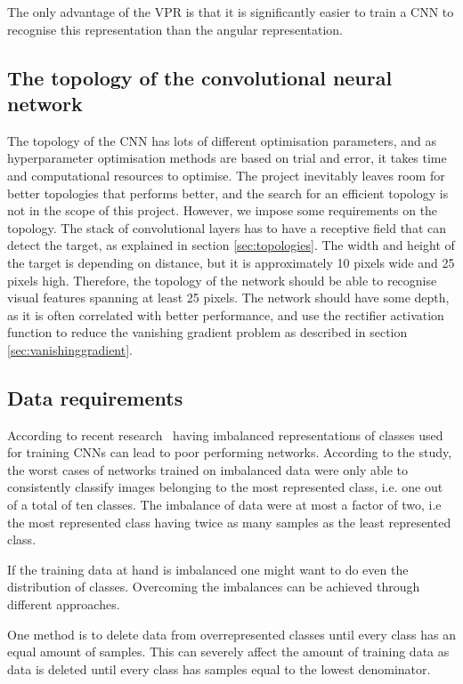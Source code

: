 The only advantage of the VPR is that it is significantly easier to train a CNN to recognise this representation than the angular representation.

\subsection{The topology of the convolutional neural network}
The topology of the CNN has lots of different optimisation parameters, and as hyperparameter optimisation methods are based on trial and error, it takes time and computational resources to optimise. The project inevitably leaves room for better topologies that performs better, and the search for an efficient topology is not in the scope of this project. However, we impose some requirements on the topology. The stack of convolutional layers has to have a receptive field that can detect the target, as explained in section \ref{sec:topologies}. The width and height of the target is depending on distance, but it is approximately 10 pixels wide and 25 pixels high. Therefore, the topology of the network should be able to recognise visual features spanning at least 25 pixels. The network should have some depth, as it is often correlated with better performance\cite{christian}\cite{karen}, and use the rectifier activation function to reduce the vanishing gradient problem as described in section \ref{sec:vanishinggradient}.

\subsection{Data requirements}
According to recent research~\cite{balanced-classes} having imbalanced representations of classes used for training CNNs can lead to poor performing networks. According to the study, the worst cases of networks trained on imbalanced data were only able to consistently classify images belonging to the most represented class, i.e. one out of a total of ten classes. The imbalance of data were at most a factor of two, i.e the most represented class having twice as many samples as the least represented class.

If the training data at hand is imbalanced one might want to do even the distribution of classes. Overcoming the imbalances can be achieved through different approaches.

One method is to delete data from overrepresented classes until every class has an equal amount of samples. This can severely affect the amount of training data as data is deleted until every class has samples equal to the lowest denominator.

